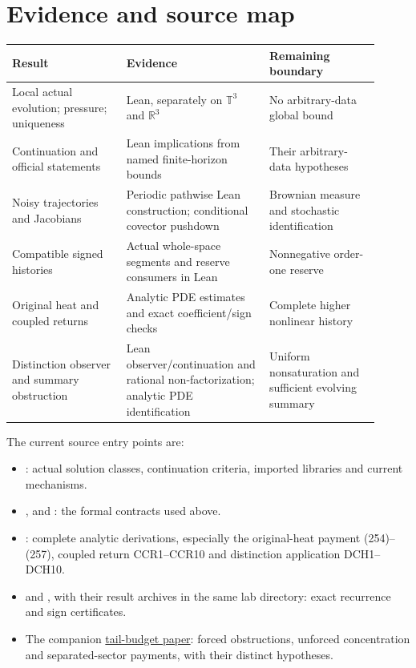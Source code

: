 \documentclass[11pt]{article}
\theoremstyle{definition}
\begin{document}
\section{Evidence and source map}
\label{sec:current-evidence}

\begin{center}
\small
\renewcommand{\arraystretch}{1.12}
\begin{tabular}{>{\raggedright\arraybackslash}p{0.29\linewidth}>{\raggedright\arraybackslash}p{0.35\linewidth}>{\raggedright\arraybackslash}p{0.27\linewidth}}
\toprule
Result & Evidence & Remaining boundary \\
\midrule
Local actual evolution; pressure; uniqueness
 & Lean, separately on $\mathbb T^3$ and $\mathbb R^3$
 & No arbitrary-data global bound \\
Continuation and official statements
 & Lean implications from named finite-horizon bounds
 & Their arbitrary-data hypotheses \\
Noisy trajectories and Jacobians
 & Periodic pathwise Lean construction; conditional covector pushdown
 & Brownian measure and stochastic identification \\
Compatible signed histories
 & Actual whole-space segments and reserve consumers in Lean
 & Nonnegative order-one reserve \\
Original heat and coupled returns
 & Analytic PDE estimates and exact coefficient/sign checks
 & Complete higher nonlinear history \\
Distinction observer and summary obstruction
 & Lean observer/continuation and rational non-factorization;
   analytic PDE identification
 & Uniform nonsaturation and sufficient evolving summary \\
\bottomrule
\end{tabular}
\end{center}

The current source entry points are:
\begingroup
\raggedright
\begin{itemize}
 \item {}: actual solution classes,
       continuation criteria, imported libraries and current mechanisms.
 \item {},
        and :
       the formal contracts used above.
 \item {}: complete analytic derivations,
       especially the original-heat payment (254)--(257), coupled return
       CCR1--CCR10 and distinction application DCH1--DCH10.
 \item {} and
       , with their result archives in
       the same lab directory: exact recurrence and sign certificates.
 \item The companion \href{../ns_forced_tail_budget.pdf}{tail-budget paper}:
       forced obstructions, unforced concentration and separated-sector
       payments, with their distinct hypotheses.
\end{itemize}
\end{document}

